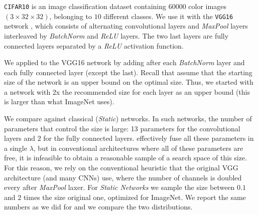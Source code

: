 \texttt{CIFAR10} is an image classification dataset containing $60000$ color
images $(3 \times 32 \times 32)$, belonging to $10$ different classes. We use it
with the \texttt{VGG16} network \cite{Srivastava2014}, which consists of
alternating convolutional layers and \textit{MaxPool} layers interleaved by
\textit{BatchNorm} \cite{DBLP:journals/corr/IoffeS15} and \textit{ReLU}
\cite{Nair2010}  layers.  The two last layers are fully connected layers
separated by a \textit{ReLU} activation function.


We applied \shrink to the VGG16 network by adding \swls
after each \textit{BatchNorm} layer and each fully connected layer (except the
last).  Recall that \shrink assume that the starting size of the network is
an upper bound on the optimal size. Thus, we started with a
network with 2x the recommended size for each layer as an upper bound (this
is larger than what ImageNet uses). 

We compare against classical (\textit{Static}) networks. In such networks, the
number of parameters that control the size is large: 13 parameters for the
convolutional layers and $2$ for the fully connected layers. \shrink
effectively fuse all these parameters in a single $\lambda$, but in conventional
architectures where all of these parameters are free, it is infeasible to obtain
a reasonable sample of a search space of this size. For this reason, we rely on
the conventional heuristic that the original VGG architecture (and many CNNs)
use, where the number of channels is doubled every after \textit{MaxPool} laxer.
For \textit{Static Networks} we sample the size between $0.1$ and $2$ times the size
original one, optimized for ImageNet. We report the same numbers as we did for
\shrink and we compare the two distributions. 

